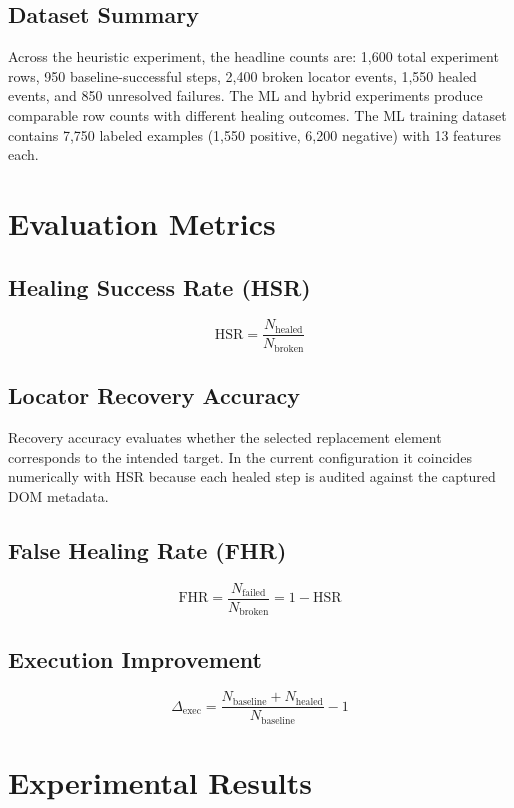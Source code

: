 \documentclass[12pt]{article}
\begin{document}
\subsection{Dataset Summary}

Across the heuristic experiment, the headline counts are: 1,600 total experiment rows, 950 baseline-successful steps, 2,400 broken locator events, 1,550 healed events, and 850 unresolved failures. The ML and hybrid experiments produce comparable row counts with different healing outcomes. The ML training dataset contains 7,750 labeled examples (1,550 positive, 6,200 negative) with 13 features each.

\section{Evaluation Metrics}
\label{sec:metrics}

\subsection{Healing Success Rate (HSR)}
\[
\mathrm{HSR} = \frac{N_{\text{healed}}}{N_{\text{broken}}}
\]

\subsection{Locator Recovery Accuracy}
Recovery accuracy evaluates whether the selected replacement element corresponds to the intended target. In the current configuration it coincides numerically with HSR because each healed step is audited against the captured DOM metadata.

\subsection{False Healing Rate (FHR)}
\[
\mathrm{FHR} = \frac{N_{\text{failed}}}{N_{\text{broken}}} = 1 - \mathrm{HSR}
\]

\subsection{Execution Improvement}
\[
\Delta_{\text{exec}} = \frac{N_{\text{baseline}} + N_{\text{healed}}}{N_{\text{baseline}}} - 1
\]

\section{Experimental Results}
\label{sec:results}
\end{document}
